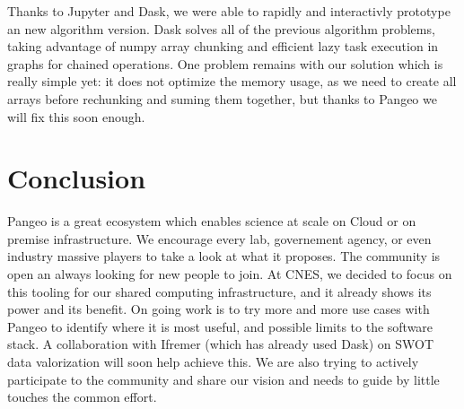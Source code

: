 \documentclass{article}
\begin{document}
Thanks to Jupyter and Dask, we were able to rapidly and interactivly prototype an new algorithm version. Dask solves all of the previous algorithm problems, taking advantage of numpy array chunking and efficient lazy task execution in graphs for chained operations. One problem remains with our solution which is really simple yet: it does not optimize the memory usage, as we need to create all arrays before rechunking and suming them together, but thanks to Pangeo we will fix this soon enough.

\section{Conclusion}
\label{sec:conclusion}

Pangeo is a great ecosystem which enables science at scale on Cloud or on premise infrastructure. We encourage every lab, governement agency, or even industry massive players to take a look at what it proposes. The community is open an always looking for new people to join.
At CNES, we decided to focus on this tooling for our shared computing infrastructure, and it already shows its power and its benefit. On going work is to try more and more use cases with Pangeo to identify where it is most useful, and possible limits to the software stack. A collaboration with Ifremer (which has already used Dask\cite{b9}) on SWOT data valorization will soon help achieve this. We are also trying to actively participate to the community and share our vision and needs to guide by little touches the common effort.







\small
\end{document}
